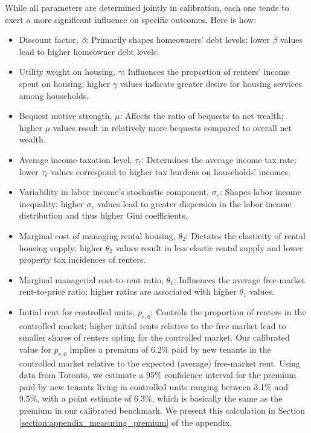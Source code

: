 \documentclass[parskip=full]{article}
\begin{document}
While all parameters are determined jointly in calibration, each one tends to exert a more significant influence on specific outcomes. Here is how:
\begin{itemize}
    \item Discount factor, $\beta$: Primarily shapes homeowners' debt levels; lower $\beta$ values lead to higher homeowner debt levels.
    \item Utility weight on housing, $\gamma$: Influences the proportion of renters' income spent on housing; higher $\gamma$ values indicate greater desire for housing services among households.
    \item Bequest motive strength, $\mu$: Affects the ratio of bequests to net wealth; higher $\mu$ values result in relatively more bequests compared to overall net wealth.
    \item Average income taxation level, $\tau_{\ell}$: Determines the average income tax rate; lower $\tau_{\ell}$ values correspond to higher tax burdens on households' incomes.
    \item Variability in labor income's stochastic component, $\sigma_{e}$: Shapes labor income inequality; higher $\sigma_{e}$ values lead to greater dispersion in the labor income distribution and thus higher Gini coefficients.
    \item Marginal cost of managing rental housing, $\theta_{2}$: Dictates the elasticity of rental housing supply; higher $\theta_{2}$ values result in less elastic rental supply and lower property tax incidences of renters.
    \item Marginal managerial cost-to-rent ratio, $\theta_{1}$: Influences the average free-market rent-to-price ratio; higher ratios are associated with higher $\theta_{1}$ values.
    \item Initial rent for controlled units, $p_{r,0}$: Controls the proportion of renters in the controlled market; higher initial rents relative to the free market lead to smaller shares of renters opting for the controlled market. Our calibrated value for $p_{r,0}$ implies a premium of 6.2\% paid by new tenants in the controlled market relative to the expected (average) free-market rent. Using data from Toronto, we estimate a 95\% confidence interval for the premium paid by new tenants living in controlled units ranging between 3.1\% and 9.5\%, with a point estimate of 6.3\%, which is basically the same as the premium in our calibrated benchmark. We present this calculation in Section \ref{section:appendix_measuring_premium} of the appendix.

\end{itemize}
\end{document}
